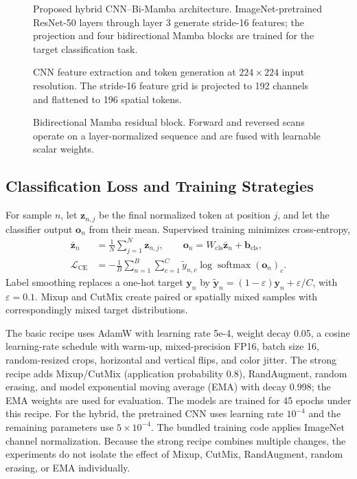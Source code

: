 \documentclass[conference]{IEEEtran}
\begin{document}
\begin{figure}[t]
\centering
\HybridArchitectureDiagram
\caption{Proposed hybrid CNN--Bi-Mamba architecture. ImageNet-pretrained ResNet-50 layers through layer 3 generate stride-16 features; the projection and four bidirectional Mamba blocks are trained for the target classification task.}
\label{fig:hybrid-architecture}
\end{figure}

\begin{figure}[t]
\centering
\CNNTokenDiagram
\caption{CNN feature extraction and token generation at $224\times224$ input resolution. The stride-16 feature grid is projected to 192 channels and flattened to 196 spatial tokens.}
\label{fig:cnn-tokens}
\end{figure}

\begin{figure}[t]
\centering
\BiMambaDiagram
\caption{Bidirectional Mamba residual block. Forward and reversed scans operate on a layer-normalized sequence and are fused with learnable scalar weights.}
\label{fig:bimamba-block}
\end{figure}

\subsection{Classification Loss and Training Strategies}
For sample $n$, let $\mathbf{z}_{n,j}$ be the final normalized token at position $j$, and let the classifier output $\mathbf{o}_n$ from their mean. Supervised training minimizes cross-entropy,
\begin{align}
    \bar{\mathbf{z}}_n &= \frac{1}{N}\sum_{j=1}^{N}\mathbf{z}_{n,j},\qquad
    \mathbf{o}_n=W_{\mathrm{cls}}\bar{\mathbf{z}}_n+\mathbf{b}_{\mathrm{cls}},\\
    \mathcal{L}_{\mathrm{CE}} &=-\frac{1}{B}\sum_{n=1}^{B}\sum_{c=1}^{C}\widetilde{y}_{n,c}\log\operatorname{softmax}(\mathbf{o}_n)_c.
    \label{eq:classification-loss}
\end{align}
Label smoothing replaces a one-hot target $\mathbf{y}_n$ by $\widetilde{\mathbf{y}}_n=(1-\varepsilon)\mathbf{y}_n+\varepsilon/C$, with $\varepsilon=0.1$. Mixup and CutMix create paired or spatially mixed samples with correspondingly mixed target distributions.

The basic recipe uses AdamW with learning rate 5e-4, weight decay 0.05, a cosine learning-rate schedule with warm-up, mixed-precision FP16, batch size 16, random-resized crops, horizontal and vertical flips, and color jitter. The strong recipe adds Mixup/CutMix (application probability 0.8), RandAugment, random erasing, and model exponential moving average (EMA) with decay 0.998; the EMA weights are used for evaluation. The models are trained for 45 epochs under this recipe. For the hybrid, the pretrained CNN uses learning rate $10^{-4}$ and the remaining parameters use $5\times10^{-4}$. The bundled training code applies ImageNet channel normalization. Because the strong recipe combines multiple changes, the experiments do not isolate the effect of Mixup, CutMix, RandAugment, random erasing, or EMA individually.
\end{document}
